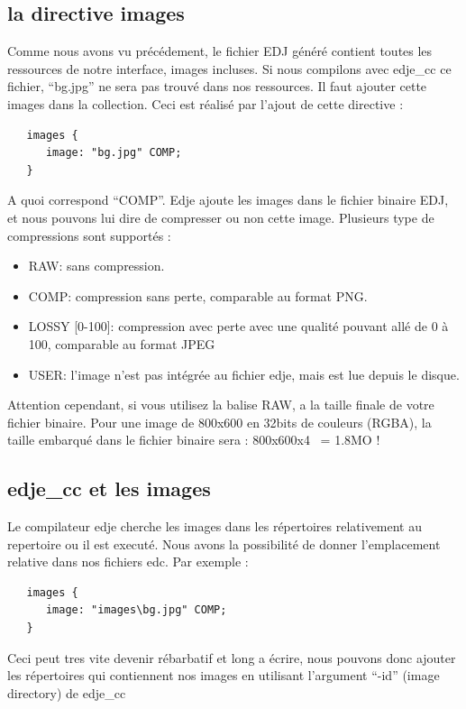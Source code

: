\documentclass[a4paper]{efr}
\begin{document}
\subsection{la directive images}
Comme nous avons vu précédement, le fichier EDJ généré contient toutes les
ressources de notre interface, images incluses. Si nous compilons avec edje\_cc
ce fichier, ``bg.jpg'' ne sera pas trouvé dans nos ressources. Il faut ajouter
cette images dans la collection. Ceci est réalisé par l'ajout de cette directive
:
\begin{lstlisting}
   images {
      image: "bg.jpg" COMP;
   }
\end{lstlisting}

A quoi correspond ``COMP''. Edje ajoute les images dans le fichier binaire EDJ,
et nous pouvons lui dire de compresser ou non cette image.
Plusieurs type de compressions sont supportés :
\begin{itemize}
\item RAW: sans compression.
\item COMP: compression sans perte, comparable au format PNG.
\item LOSSY [0-100]: compression avec perte avec une qualité pouvant allé
de 0 à 100, comparable au format JPEG
\item USER: l'image n'est pas intégrée au fichier edje, mais est lue depuis
le disque.
\end{itemize}

Attention cependant, si vous utilisez la balise RAW, a la taille
finale de votre fichier binaire.
Pour une image de 800x600 en 32bits de couleurs (RGBA), la taille embarqué dans
le fichier binaire sera : 800x600x4 ~= 1.8MO !

\subsection{edje\_cc et les images}
Le compilateur edje cherche les images dans les répertoires relativement au
repertoire ou il est executé.
Nous avons la possibilité de donner l'emplacement relative dans nos fichiers
edc. Par exemple :

\begin{lstlisting}
   images {
      image: "images\bg.jpg" COMP;
   }
\end{lstlisting}

Ceci peut tres vite devenir rébarbatif et long a écrire, nous pouvons donc
ajouter les répertoires qui contiennent nos images en utilisant l'argument
``-id'' (image directory) de edje\_cc
\end{document}
